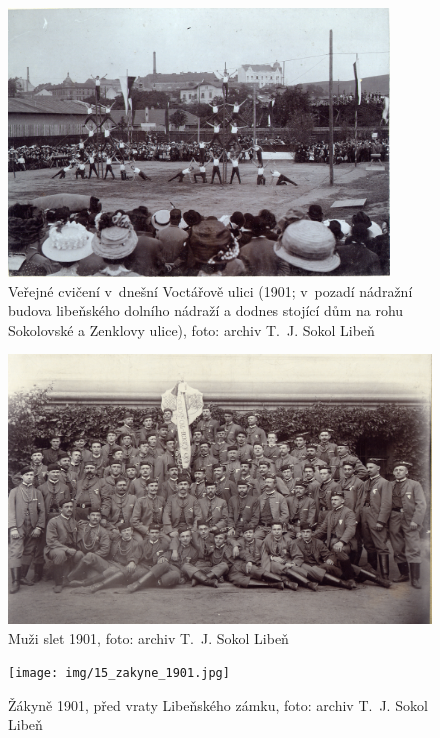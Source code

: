 \documentclass[a5paper, 11pt, twoside]{article}
\begin{document}
\begin{figure}[hp]
  \centering
  \includegraphics[width=0.9\textwidth]{img/13_verejne_cviceni.jpg}
  \caption*{Veřejné cvičení v~dnešní Voctářově ulici (1901; v~pozadí nádražní budova libeňského dolního nádraží a dodnes stojící dům na rohu Sokolovské a Zenklovy ulice), foto: archiv T.~J. Sokol Libeň}
\end{figure}

\begin{figure}[hp]
  \centering
  \includegraphics[width=\textwidth]{img/14_muzi_slet_1901.jpg}
  \caption*{Muži slet 1901, foto: archiv T.~J. Sokol Libeň}
\end{figure}

\begin{figure}[h!]
  \centering
  \texttt{[image: img/15\_zakyne\_1901.jpg]}
  \caption*{Žákyně 1901, před vraty Libeňského zámku, foto: archiv T.~J. Sokol Libeň}
\end{figure}
\end{document}

